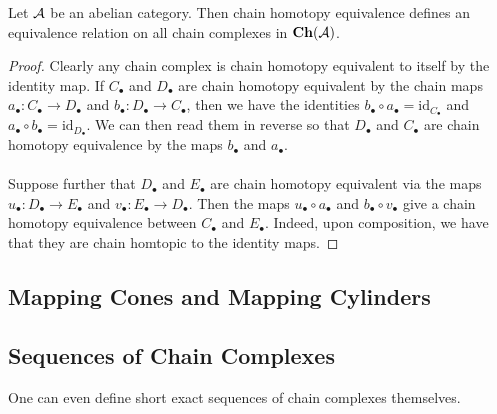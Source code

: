 \documentclass[a4paper]{article}
\begin{document}
\begin{prp}{}{} Let $\mathcal{A}$ be an abelian category. Then chain homotopy equivalence defines an equivalence relation on all chain complexes in $\bold{Ch}(\mathcal{A})$. \tcbline
\begin{proof}
Clearly any chain complex is chain homotopy equivalent to itself by the identity map. If $C_\bullet$ and $D_\bullet$ are chain homotopy equivalent by the chain maps $a_\bullet:C_\bullet\to D_\bullet$ and $b_\bullet:D_\bullet\to C_\bullet$, then we have the identities $b_\bullet\circ a_\bullet=\text{id}_{C_\bullet}$ and $a_\bullet\circ b_\bullet=\text{id}_{D_\bullet}$. We can then read them in reverse so that $D_\bullet$ and $C_\bullet$ are chain homotopy equivalence by the maps $b_\bullet$ and $a_\bullet$. \\~\\

Suppose further that $D_\bullet$ and $E_\bullet$ are chain homotopy equivalent via the maps $u_\bullet:D_\bullet\to E_\bullet$ and $v_\bullet:E_\bullet\to D_\bullet$. Then the maps $u_\bullet\circ a_\bullet$ and $b_\bullet\circ v_\bullet$ give a chain homotopy equivalence between $C_\bullet$ and $E_\bullet$. Indeed, upon composition, we have that they are chain  homtopic to the identity maps. 
\end{proof}
\end{prp}

\subsection{Mapping Cones and Mapping Cylinders}

\subsection{Sequences of Chain Complexes}
One can even define short exact sequences of chain complexes themselves. 
\end{document}
